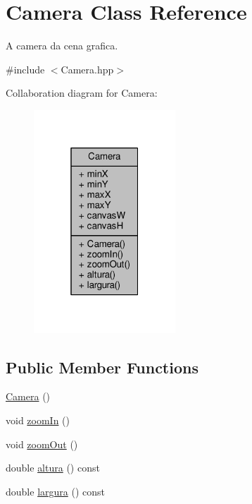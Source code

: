 \hypertarget{classCamera}{\section{Camera Class Reference}
\label{classCamera}
}


A camera da cena grafica.  




{\ttfamily \#include $<$Camera.\+hpp$>$}



Collaboration diagram for Camera\+:
\nopagebreak
\begin{figure}[H]
\begin{center}
\leavevmode
\includegraphics[width=151pt]{classCamera__coll__graph}
\end{center}
\end{figure}
\subsection*{Public Member Functions}
\begin{DoxyCompactItemize}
\item 
\hyperlink{classCamera_a01f94c3543f56ede7af49dc778f19331}{Camera} ()
\item 
void \hyperlink{classCamera_a62d35e87b3eeac9463f43c17b65ef090}{zoom\+In} ()
\item 
void \hyperlink{classCamera_aafc1d985053e11bd553b8a12540a562d}{zoom\+Out} ()
\item 
double \hyperlink{classCamera_a9c26d30741cf690d4f47231d80ccc2e5}{altura} () const 
\item 
double \hyperlink{classCamera_a4dfbaf74d326996e4e725e569f4c2b5b}{largura} () const 
\end{DoxyCompactItemize}
